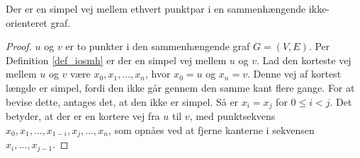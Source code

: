 \begin{thm}
Der er en simpel vej mellem ethvert punktpar i en sammenhængende ikke-orienteret graf.
\end{thm}

\begin{proof}
$u$ og $v$ er to punkter i den sammenhængende graf $G=(V,E)$.
Per Definition \ref{def_iosmh} er der en simpel vej mellem $u$ og $v$.
Lad den korteste vej mellem $u$ og $v$ være $x_0,x_1,...,x_n$, hvor $x_0=u$ og $x_n=v$.
Denne vej af kortest længde er simpel, fordi den ikke går gennem den samme kant flere gange. 
For at bevise dette, antages det, at den ikke er simpel. 
Så er $x_i=x_j$ for $0 \leq i < j$.
Det betyder, at der er en kortere vej fra $u$ til $v$, med punktsekvens $x_0,x_1,...,x_{1-i},x_j,...,x_n$, som opnåes ved at fjerne kanterne i sekvensen $x_i,...,x_{j-1}$.
\end{proof}

